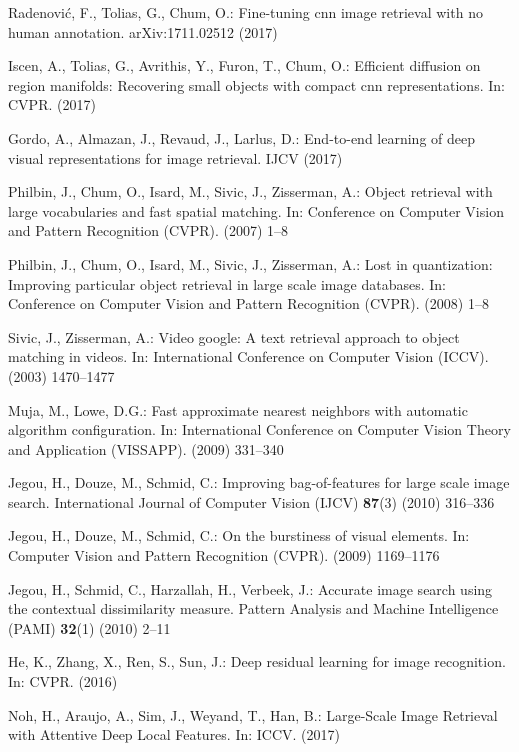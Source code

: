 \documentclass[runningheads]{llncs}
\begin{document}
{\begin{thebibliography}{10}
Radenovi{\'c}, F., Tolias, G., Chum, O.:
\newblock Fine-tuning cnn image retrieval with no human annotation.
\newblock arXiv:1711.02512 (2017)

Iscen, A., Tolias, G., Avrithis, Y., Furon, T., Chum, O.:
\newblock Efficient diffusion on region manifolds: Recovering small objects
  with compact cnn representations.
\newblock In: CVPR. (2017)

Gordo, A., Almazan, J., Revaud, J., Larlus, D.:
\newblock End-to-end learning of deep visual representations for image
  retrieval.
\newblock IJCV (2017)

Philbin, J., Chum, O., Isard, M., Sivic, J., Zisserman, A.:
\newblock Object retrieval with large vocabularies and fast spatial matching.
\newblock In: Conference on Computer Vision and Pattern Recognition {(CVPR)}.
  (2007)  1--8

Philbin, J., Chum, O., Isard, M., Sivic, J., Zisserman, A.:
\newblock Lost in quantization: Improving particular object retrieval in large
  scale image databases.
\newblock In: Conference on Computer Vision and Pattern Recognition {(CVPR)}.
  (2008)  1--8

Sivic, J., Zisserman, A.:
\newblock Video google: A text retrieval approach to object matching in videos.
\newblock In: International Conference on Computer Vision ({ICCV}). (2003)
  1470--1477

Muja, M., Lowe, D.G.:
\newblock Fast approximate nearest neighbors with automatic algorithm
  configuration.
\newblock In: International Conference on Computer Vision Theory and
  Application {(VISSAPP)}. (2009)  331--340

Jegou, H., Douze, M., Schmid, C.:
\newblock Improving bag-of-features for large scale image search.
\newblock International Journal of Computer Vision {(IJCV)} \textbf{87}(3)
  (2010)  316--336

Jegou, H., Douze, M., Schmid, C.:
\newblock On the burstiness of visual elements.
\newblock In: Computer Vision and Pattern Recognition {(CVPR)}. (2009)
  1169--1176

Jegou, H., Schmid, C., Harzallah, H., Verbeek, J.:
\newblock Accurate image search using the contextual dissimilarity measure.
\newblock Pattern Analysis and Machine Intelligence {(PAMI)} \textbf{32}(1)
  (2010)  2--11

He, K., Zhang, X., Ren, S., Sun, J.:
\newblock Deep residual learning for image recognition.
\newblock In: CVPR. (2016)

Noh, H., Araujo, A., Sim, J., Weyand, T., Han, B.:
\newblock Large-Scale Image Retrieval with Attentive Deep Local Features.
\newblock In: ICCV. (2017)


\end{thebibliography}
 }
\end{document}

